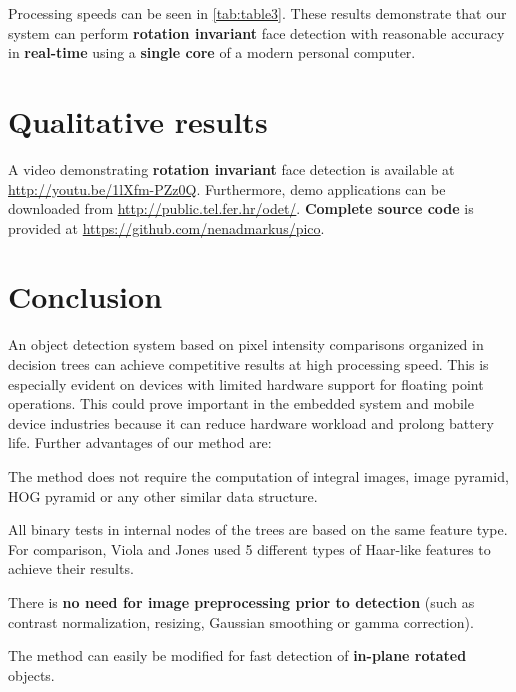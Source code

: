 \documentclass[a4paper,12pt]{article}
\begin{document}
Processing speeds can be seen in \autoref{tab:table3}. These results demonstrate
that our system can perform \textbf{rotation invariant} face detection
with reasonable accuracy in \textbf{real-time} using a \textbf{single core} of a modern personal computer.

\section{Qualitative results}
A video demonstrating \textbf{rotation invariant} face detection is available at
\url{http://youtu.be/1lXfm-PZz0Q}.
Furthermore, demo applications can be downloaded from \url{http://public.tel.fer.hr/odet/}.
\textbf{Complete source code} is provided at \url{https://github.com/nenadmarkus/pico}.

\section{Conclusion}
An object detection system based on pixel intensity comparisons organized in decision trees
can achieve competitive results at high processing speed. This is especially evident on devices with limited hardware support for floating point operations. This could prove important in the embedded system and mobile device industries because it can reduce hardware workload and prolong battery life.
Further advantages of our method are:
\begin{compactitem}
\item The method does not require the computation of integral
images, image pyramid, HOG pyramid or any other
similar data structure.
\item All binary tests in internal nodes of the trees are based on
the same feature type. For comparison, Viola and Jones
used 5 different types of Haar-like features to achieve
their results.
\item There is \textbf{no need for image preprocessing prior to detection} (such as contrast normalization, resizing, Gaussian smoothing or gamma correction).
\item The method can easily be modified for fast detection of \textbf{in-plane rotated} objects.
\end{compactitem}

\clearpage
%
{}

\end{document}
